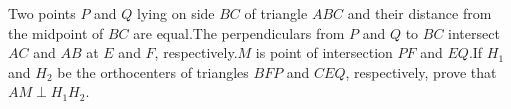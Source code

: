 Two points $P$ and $Q$ lying on side $BC$ of  triangle $ABC$ and their distance from the midpoint of $BC$ are equal.The perpendiculars from $P$ and $Q$ to $BC$ intersect $AC$ and $AB$ at $E$ and $F$, respectively.$M$ is point of intersection $PF$ and $EQ$.If $H_1$ and $H_2$ be the orthocenters of triangles $BFP$ and $CEQ$,  respectively, prove that $ AM\perp H_1H_2 $.